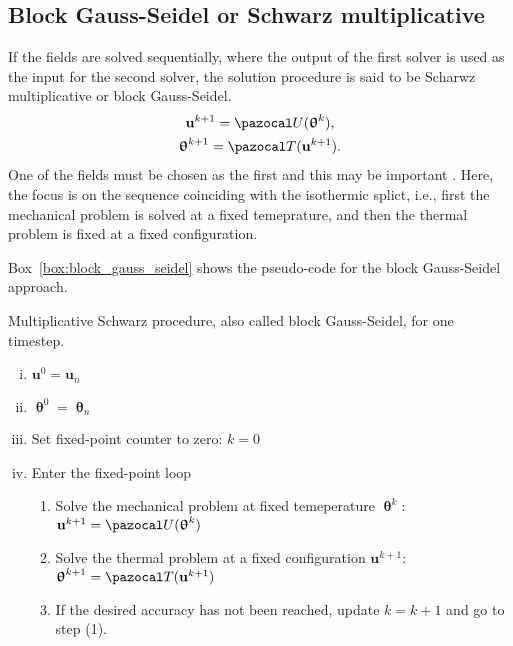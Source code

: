 \subsection{Block Gauss-Seidel or Schwarz multiplicative}

If the fields are solved sequentially, where the output of the first solver is used as the input for the second solver, the solution procedure is said to be Scharwz multiplicative or block Gauss-Seidel.
\begin{gather}
\mathbf u^{k+1}  = \pazocal U(\bm \uptheta^k),\\
\bm \uptheta^{k+1} = \pazocal T(\mathbf u^{k+1}).
\end{gather}
One of the fields must be chosen as the first and this may be important \citep{joosten_analysis_2009}.
Here, the focus is on the sequence coinciding with the isothermic splict, i.e., first the mechanical problem is solved at a fixed temeprature, and then the thermal problem is fixed at a fixed configuration.

Box~\ref{box:block_gauss_seidel} shows the pseudo-code for the block Gauss-Seidel approach.

\begin{framedbox}[htb]
  \caption{Multiplicative Schwarz procedure, also called block Gauss-Seidel, for one timestep.}
  \label{box:block_gauss_seidel}
  \begin{center}
    \begin{minipage}{0.9\textwidth}
    \begin{enumerate}[(i)]
    \item \(\mathbf u^0 = \mathbf u_{n}\)
    \item \(\bm \uptheta^0 = \bm \uptheta_n\)
      \item Set fixed-point counter to zero: \(k=0\)
    \item Enter the fixed-point loop
    \begin{enumerate}[(1)]
      \item Solve the mechanical problem at fixed temeperature \(\bm \uptheta^k\): \(\mathbf u^{k+1} = \pazocal U(\bm \uptheta^k)\)
      \item Solve the thermal problem at a fixed configuration \(\mathbf u^{k+1}\): \(\bm \uptheta^{k+1} = \pazocal T(\mathbf u^{k+1})\)
      \item If the desired accuracy has not been reached, update \(k=k+1\) and go to step (1).

    \end{enumerate}
    \end{enumerate}
    \end{minipage}
  \end{center}
\end{framedbox}

